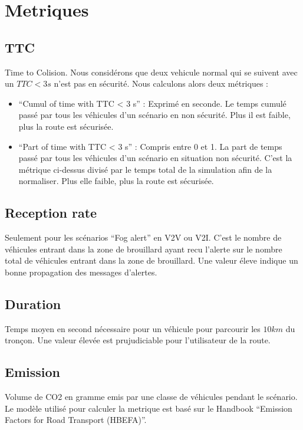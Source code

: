 \documentclass[a4paper,10pt]{report}
\begin{document}
\section{Metriques}


\subsection{TTC}

Time to Colision. Nous considérons que deux vehicule normal qui se suivent avec un $TTC < 3 s$  n'est pas en sécurité. Nous calculons alors deux métriques :

\begin{itemize}
 \item ``Cumul of time with TTC < 3 s'' : Exprimé en seconde. Le temps cumulé passé  par tous les véhicules d'un scénario en non sécurité. Plus il est faible, plus la route est sécurisée.
 \item ``Part of time with TTC < 3 s'' : Compris entre 0 et 1. La part de temps passé  par tous les véhicules d'un scénario en situation non sécurité. C'est la métrique ci-dessus divisé par le temps total de la simulation afin de la normaliser. Plus elle faible, plus la route est sécurisée.
\end{itemize}

\subsection{Reception rate}

Seulement pour les scénarios ``Fog alert'' en V2V ou V2I. C'est le nombre de véhicules entrant dans la zone de brouillard ayant recu l'alerte sur le nombre total de véhicules entrant dans la zone de brouillard. Une valeur éleve indique un bonne propagation des messages d'alertes.

\subsection{Duration}

Temps moyen en second nécessaire pour un véhicule pour parcourir les $10 km$ du tronçon. Une valeur élevée est prujudiciable pour l'utilisateur de la route.

\subsection{Emission}

Volume de CO2 en gramme emis par une classe de véhicules pendant le scénario. Le modèle utilisé pour calculer la metrique est basé sur le Handbook ``Emission Factors for Road Transport (HBEFA)''.
\end{document}

